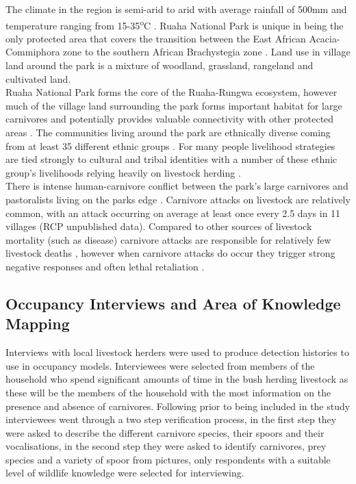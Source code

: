 The climate in the region is semi-arid to arid with average rainfall of 500mm \cite{Dickman2008} and temperature ranging from 15-35\textsuperscript{o}C \cite{Darch1999}. Ruaha National Park is unique in being the only protected area that covers the transition between the East African Acacia-Commiphora zone to the southern African Brachystegia zone \cite{Douglas-Hamilton1982,Williams1999}. Land use in village land around the park is a mixture of woodland, grassland, rangeland and cultivated land.\\

Ruaha National Park forms the core of the Ruaha-Rungwa ecosystem, however much of the village land surrounding the park forms important habitat for large carnivores and potentially provides valuable connectivity with other protected areas \cite{Dickman2005,Abade2014h}. The communities living around the park are ethnically diverse coming from at least 35 different ethnic groups \cite{Williams2005}. For many people livelihood strategies are tied strongly to cultural and tribal identities \cite{Williams2005,Dickman2008} with a number of these ethnic group's livelihoods relying heavily on livestock herding \cite{Dickman2008}.\\

There is intense human-carnivore conflict between the park's large carnivores and pastoralists living on the parks edge \cite{Dickman2008}. Carnivore attacks on livestock are relatively common, with an attack occurring on average at least once every 2.5 days in 11 villages (RCP unpublished data). Compared to other sources of livestock mortality (such as disease) carnivore attacks are responsible for relatively few livestock deaths \cite{Dickman2014d}, however when carnivore attacks do occur they trigger strong negative responses and often lethal retaliation \cite{Abade2014g,Dickman2008}. 

\subsection*{Occupancy Interviews and Area of Knowledge Mapping}

Interviews with local livestock herders were used to produce detection histories to use in occupancy models. Interviewees were selected from members of the household who spend significant amounts of time in the bush herding livestock as these will be the members of the household with the most information on the presence and absence of carnivores. Following \citet{Zeller2011} prior to being included in the study interviewees went through a two step verification process, in the first step they were asked to describe the different carnivore species, their spoors and their vocalisations, in the second step they were asked to identify carnivores, prey species and a variety of spoor from pictures, only respondents with a suitable level of wildlife knowledge were selected for interviewing.\\

